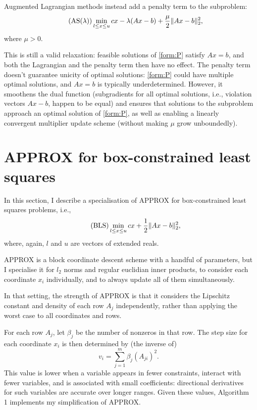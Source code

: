 \documentclass{article}
\newcommand{\LeftEqNo}{\let\veqno\leqno}
\begin{document}
Augmented Lagrangian methods \citep{Nocedal:2006uv} instead add a
penalty term to the subproblem:
\begin{equation}\LeftEqNo
\tag{AS$(\lambda)$} \min_{l\leq x\leq u} cx - \lambda(Ax-b) +
\frac{\mu}{2}\|Ax-b\|_2^2,
\end{equation}
where \(\mu>0\).

This is still a valid relaxation: feasible solutions of \eqref{form:P}
satisfy \(Ax=b\), and both the Lagrangian and the penalty term then
have no effect.  The penalty term doesn't guarantee unicity of optimal
solutions: \eqref{form:P} could have multiple optimal solutions, and
\(Ax=b\) is typically underdetermined.  However, it smoothens the dual
function (subgradients for all optimal solutions, i.e., violation
vectors \(Ax-b\), happen to be equal) and ensures that solutions to
the subproblem approach an optimal solution of \eqref{form:P}, as well
as enabling a linearly convergent multiplier update scheme (without
making \(\mu\) grow unboundedly).

\section{APPROX for box-constrained least squares}
In this section, I describe a specialisation of APPROX
\citep{Fercoq:2013wv} for box-constrained least squares problems,
i.e.,
\begin{equation}\LeftEqNo
\tag{BLS}\label{form:BLS}\min_{l\leq x\leq u} cx + \frac{1}{2}\|Ax-b\|_2^2,
\end{equation}
where, again, \(l\) and \(u\) are vectors of extended reals.

APPROX is a block coordinate descent scheme with a handful of
parameters, but I specialise it for \(l_2\) norms and regular
euclidian inner products, to consider each coordinate \(x_i\)
individually, and to always update all of them simultaneously.

In that setting, the strength of APPROX is that it considers the
Lipschitz constant and density of each row \(A_j\) independently,
rather than applying the worst case to all coordinates and rows.

For each row \(A_j\), let \(\beta_j\) be the number of nonzeros in
that row.  The step size for each coordinate \(x_i\) is then determined
by (the inverse of)
\[v_i = \sum_{j=1}^m \beta_j(A_{ji})^2.\] This value is lower when a
variable appears in fewer constraints, interact with fewer variables,
and is associated with small coefficients: directional derivatives for
such variables are accurate over longer ranges.  Given these values,
Algorithm 1 implements my simplification of APPROX.
\end{document}
